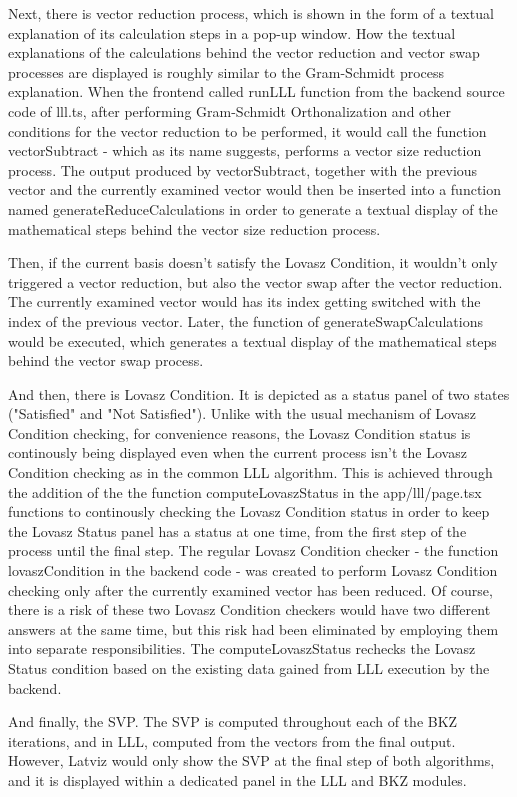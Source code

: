 Next, there is vector reduction process, which is shown in the form of a textual explanation of its calculation steps in a pop-up window. How the textual explanations of the calculations behind the vector reduction and vector swap processes are displayed is roughly similar to the Gram-Schmidt process explanation. When the frontend called runLLL function from the backend source code of lll.ts, after performing Gram-Schmidt Orthonalization and other conditions for the vector reduction to be performed, it would call the function vectorSubtract - which as its name suggests, performs a vector size reduction process. The output produced by vectorSubtract, together with the previous vector and the currently examined vector would then be inserted into a function named generateReduceCalculations in order to generate a textual display of the mathematical steps behind the vector size reduction process.

Then, if the current basis doesn't satisfy the Lovasz Condition, it wouldn't only triggered a vector reduction, but also the vector swap after the vector reduction. The currently examined vector would has its index getting switched with the index of the previous vector. Later, the function of generateSwapCalculations would be executed, which generates a textual display of the mathematical steps behind the vector swap process. 

And then, there is Lovasz Condition. It is depicted as a status panel of two states ("Satisfied" and "Not Satisfied"). Unlike with the usual mechanism of Lovasz Condition checking, for convenience reasons, the Lovasz Condition status is continously being displayed even when the current process isn't the Lovasz Condition checking as in the common LLL algorithm. This is achieved through the addition of the the function computeLovaszStatus in the app/lll/page.tsx functions to continously checking the Lovasz Condition status in order to keep the Lovasz Status panel has a status at one time, from the first step of the process until the final step. The regular Lovasz Condition checker - the function lovaszCondition in the backend code - was created to perform Lovasz Condition checking only after the currently examined vector has been reduced. Of course, there is a risk of these two Lovasz Condition checkers would have two different answers at the same time, but this risk had been eliminated by employing them into separate responsibilities. The computeLovaszStatus rechecks the Lovasz Status condition based on the existing data gained from LLL execution by the backend.

And finally, the SVP. The SVP is computed throughout each of the BKZ iterations, and in LLL, computed from the vectors from the final output. However, Latviz would only show the SVP at the final step of both algorithms, and it is displayed within a dedicated panel in the LLL and BKZ modules.
